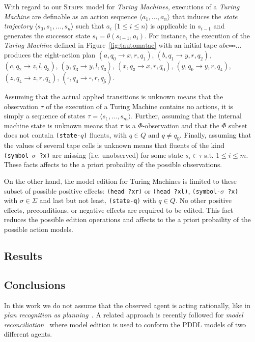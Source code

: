 \documentclass[letterpaper]{article} %
\newcommand{\tup}[1]{{\langle #1 \rangle}}
\newcommand{\strips}{\textsc{Strips}}     %
\begin{document}
With regard to our \strips\ model for {\em Turing Machines}, executions of a {\em Turing Machine} are definable as an action sequence $\tup{a_1, \ldots, a_n}$ that induces the {\em state trajectory} $\tup{s_0, s_1, \ldots, s_n}$ such that $a_i$ ({\small $1\leq i\leq n$}) is applicable in $s_{i-1}$ and generates the successor state $s_i=\theta(s_{i-1},a_i)$. For instance, the execution of the {\em Turing Machine} defined in Figure~\ref{fig:tautomatae} with an initial tape $abc\square\square\square\ldots$ produces the eight-action plan {\small $(a,q_0\rightarrow x,r,q_1)$, $(b,q_1\rightarrow y,r,q_2)$, $(c,q_2\rightarrow z,l,q_3)$, $(y,q_3\rightarrow y,l,q_3)$, $(x,q_3\rightarrow x,r,q_0)$, $(y,q_0\rightarrow y,r,q_4)$, $(z,q_4\rightarrow z,r,q_4)$, $(\square,q_4\rightarrow \square,r,\underline{q_5})$}.

Assuming that the actual applied transitions is unknown means that the observation $\tau$ of the execution of a Turing Machine contains no actions, it is simply a sequence of states $\tau=\tup{s_1, \ldots , s_m}$. Further, assuming that the internal machine state is unknown means that $\tau$ is a $\Phi$-observation and that the $\Phi$ subset does not contain {\small\tt (state-$q$)} fluents, with $q\in Q$ and $q\neq q_0$. Finally, assuming that the values of several tape cells is unknown means that fluents of the kind {\small\tt (symbol-$\sigma$ ?x)} are missing (i.e. unobserved) for some state $s_i\in \tau$ s.t. $1\leq i\leq m$. These facts affects to the a priori probaility of the possible observations.

On the other hand, the model edition for Turing Machines is limited to these subset of possible positive effects: {\tt (head ?xr)} or {\tt (head ?xl)}, {\tt(symbol-$\sigma$ ?x)} with $\sigma \in \Sigma$ and last but not least, {\tt (state-q)} with $q\in Q$. No other positive effects, preconditions, or negative effects are required to be edited. This fact reduces the possible edition operations and affects to the a priori probaility of the possible action models.

\subsection{Results}

\subsection{Conclusions}
\label{sec:conclussions}
In this work we do not assume that the observed agent is acting rationally, like in {\em plan recognition as planning}~\cite{ramirez2012plan,ramirez2009plan}. A related approach is recently followed for {\em model reconciliation}~\cite{Kambhampati:mreconciliation:ijcai17} where model edition is used to conform the PDDL models of two different agents.
\end{document}
